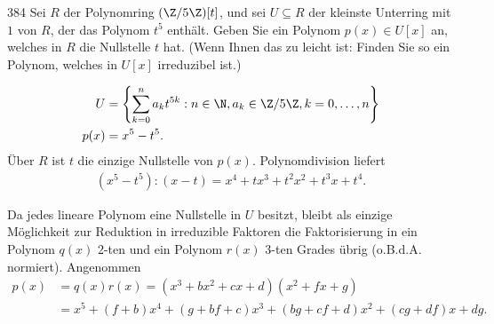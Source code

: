 \begin{algebraUE}{384}
Sei $R$ der Polynomring $(\Z/5\Z)[t]$, und sei $U \subseteq R$ der kleinste
Unterring mit $1$ von $R$, der das Polynom $t^5$ enthält. Geben Sie ein Polynom
$p(x) \in U[x]$ an, welches in $R$ die Nullstelle $t$ hat. (Wenn Ihnen das zu
leicht ist: Finden Sie so ein Polynom, welches in $U[x]$ irreduzibel ist.)
\end{algebraUE}

\begin{solution}
\begin{align*}
  U &= \left\{\sum_{k = 0}^na_kt^{5k}: n \in \N, a_k \in \Z/5\Z, k = 0,\dots,n\right\} \\
  p(x) &= x^5 - t^5.
\end{align*}
Über $R$ ist $t$ die einzige Nullstelle von $p(x)$. Polynomdivision liefert
\begin{align*}
  (x^5-t^5):(x-t) = x^4 + tx^3 + t^2x^2 + t^3x + t^4.
\end{align*}

Da jedes lineare Polynom
eine Nullstelle in $U$ besitzt, bleibt als einzige Möglichkeit zur Reduktion
in irreduzible Faktoren die Faktorisierung in ein Polynom $q(x)$ 2-ten und ein Polynom
$r(x)$ 3-ten Grades übrig (o.B.d.A. normiert).
Angenommen
\begin{align*}
  p(x) &= q(x)r(x) = (x^3 + bx^2 + cx + d)(x^2 + fx + g) \\
  &= x^5 + (f + b)x^4 + (g + bf + c)x^3 +(bg + cf + d)x^2 + (cg + df)x + dg.
\end{align*}

\end{solution}

